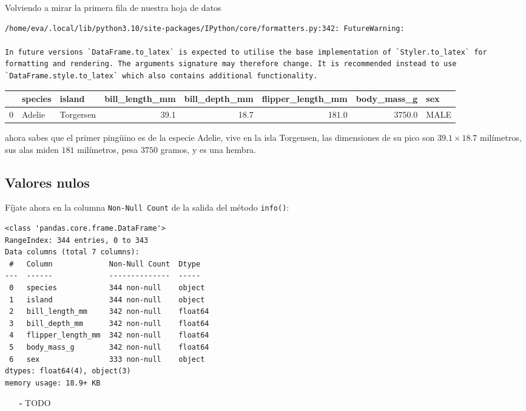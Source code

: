 \documentclass[
  a4paper,
  noprof,
  12pt,
  notoc,
  nosols,
  nobib]{mnye}
\providecommand{\tightlist}{%
  \setlength{\itemsep}{0pt}\setlength{\parskip}{0pt}}\usepackage{longtable,booktabs,array}
\theoremstyle{definition}
\theoremstyle{remark}
\begin{document}
Volviendo a mirar la primera fila de nuestra hoja de datos

\begin{verbatim}
/home/eva/.local/lib/python3.10/site-packages/IPython/core/formatters.py:342: FutureWarning:

In future versions `DataFrame.to_latex` is expected to utilise the base implementation of `Styler.to_latex` for formatting and rendering. The arguments signature may therefore change. It is recommended instead to use `DataFrame.style.to_latex` which also contains additional functionality.
\end{verbatim}

\begin{tabular}{lllrrrrl}
\toprule
{} & species &     island &  bill\_length\_mm &  bill\_depth\_mm &  flipper\_length\_mm &  body\_mass\_g &   sex \\
\midrule
0 &  Adelie &  Torgersen &            39.1 &           18.7 &              181.0 &       3750.0 &  MALE \\
\bottomrule
\end{tabular}

ahora sabes que el primer pingüino es de la especie Adelie, vive en la
isla Torgensen, las dimensiones de su pico son \(39.1 \times 18.7\)
milímetros, sus alas miden \(181\) milímetros, pesa \(3750\) gramos, y
es una hembra.

\hypertarget{valores-nulos}{%
\subsection{Valores nulos}\label{valores-nulos}}

Fíjate ahora en la columna \texttt{Non-Null\ Count} de la salida del
método \texttt{info()}:

\begin{verbatim}
<class 'pandas.core.frame.DataFrame'>
RangeIndex: 344 entries, 0 to 343
Data columns (total 7 columns):
 #   Column             Non-Null Count  Dtype  
---  ------             --------------  -----  
 0   species            344 non-null    object 
 1   island             344 non-null    object 
 2   bill_length_mm     342 non-null    float64
 3   bill_depth_mm      342 non-null    float64
 4   flipper_length_mm  342 non-null    float64
 5   body_mass_g        342 non-null    float64
 6   sex                333 non-null    object 
dtypes: float64(4), object(3)
memory usage: 18.9+ KB
\end{verbatim}

\begin{itemize}
\tightlist
\item[$\square$]
  TODO
\end{itemize}
\end{document}
